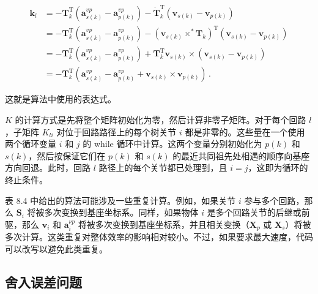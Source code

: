 \documentclass[10pt,a4paper]{book}
\theoremstyle{thmstyle} %
\theoremstyle{defstyle} %
\theoremstyle{prostyle} %
\begin{document}
$$
\begin{array}{rl} { \boldsymbol{ k } _ { l } } & { = - \boldsymbol{ T } _ { k } ^{\mathrm { T} } ( \boldsymbol{ a } _ { s ( k ) } ^{v p} - \boldsymbol{ a } _ { p ( k ) } ^{v p} ) - \dot { \boldsymbol{ T } } _ { k } ^{\mathrm { T} } ( \boldsymbol{ v } _ { s ( k ) } - \boldsymbol{ v } _ { p ( k ) } ) } \\& { = - \boldsymbol{ T } _ { k } ^{\mathrm { T} } ( \boldsymbol{ a } _ { s ( k ) } ^{v p} - \boldsymbol{ a } _ { p ( k ) } ^{v p} ) - ( \boldsymbol{ v } _ { s ( k ) } \times ^{*} \boldsymbol{ T } _ { k } ) ^{\mathrm { T} } ( \boldsymbol{ v } _ { s ( k ) } - \boldsymbol{ v } _ { p ( k ) } ) } \\& { = - \boldsymbol{ T } _ { k } ^{\mathrm { T} } ( \boldsymbol{ a } _ { s ( k ) } ^{v p} - \boldsymbol{ a } _ { p ( k ) } ^{v p} ) + \boldsymbol{ T } _ { k } ^{\mathrm { T} } \boldsymbol{ v } _ { s ( k ) } \times \left( \boldsymbol{ v } _ { s ( k ) } - \boldsymbol{ v } _ { p ( k ) } \right) } \\& { = - \boldsymbol{ T } _ { k } ^{\mathrm { T} } ( \boldsymbol{ a } _ { s ( k ) } ^{v p} - \boldsymbol{ a } _ { p ( k ) } ^{v p} + \boldsymbol{ v } _ { s ( k ) } \times \boldsymbol{ v } _ { p ( k ) } ) \, . } \end{array}
$$



这就是算法中使用的表达式。



$K$ 的计算方式是先将整个矩阵初始化为零，然后计算非零子矩阵。对于每个回路 $l$，子矩阵 $K_{li}$ 对位于回路路径上的每个树关节 $i$ 都是非零的。这些量在一个使用两个循环变量 $i$ 和 $j$ 的 while 循环中计算。这两个变量分别初始化为 $p(k)$ 和 $s(k)$，然后按保证它们在 $p(k)$ 和 $s(k)$ 的最近共同祖先处相遇的顺序向基座方向回退。此时，回路 $l$ 路径上的每个关节都已处理到，且 $i = j$，这即为循环的终止条件。



表 8.4 中给出的算法可能涉及一些重复计算。例如，如果关节 $i$ 参与多个回路，那么 $\mathbf{S}_{i}$ 将被多次变换到基座坐标系。同样，如果物体 $i$ 是多个回路关节的后继或前驱，那么 $\boldsymbol{v}_{i}$ 和 $\boldsymbol{a}_{i}^{\nu p}$ 将被多次变换到基座坐标系，并且相关变换（$\mathbf{X}_{p}$ 或 $\mathbf{X}_{s}$）将被多次计算。这类重复对整体效率的影响相对较小。不过，如果要求最大速度，代码可以改写以避免此类重复。



\subsection{舍入误差问题}
\end{document}
